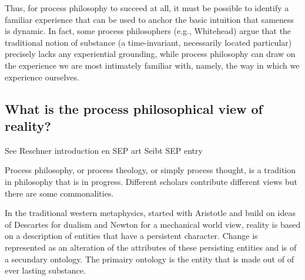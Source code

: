Thus, for process philosophy to succeed at all, it must be possible to identify a familiar experience that can be used to anchor the basic intuition that sameness is dynamic. In fact, some process philosophers (e.g., Whitehead) argue that the traditional notion of substance (a time-invariant, necessarily located particular) precisely lacks any experiential grounding, while process philosophy can draw on the experience we are most intimately familiar with, namely, the way in which we experience ourselves.


\subsection{What is the process philosophical view of reality?}



See Reschner introduction en SEP art \cite{Rescher-2012-sep}
Seibt SEP entry \cite{Seibt-2013-sep}


Process philosophy, or process theology, or simply process thought, is a tradition in philosophy that is in progress. Different scholars contribute different views but there are some commonalities.

In the traditional western metaphysics, started with Aristotle and build on ideas of Descartes for dualism and Newton for a mechanical world view, reality is based on a description of entities that have a persistent character. Change is represented as an alteration of the attributes of these persisting entities and is of a secundary ontology. The primairy ontology is the entity that is made out of of ever lasting substance.

